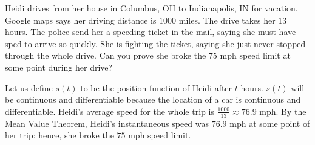 \documentclass[nooutcomes]{ximera}
\begin{document}
\begin{problem}
  Heidi drives from her house in Columbus, OH to Indianapolis, IN for vacation.
  Google maps says her driving distance is $1000$ miles.
  The drive takes her $13$ hours.
  The police send her a speeding ticket in the mail, saying she must have sped to arrive so quickly.
  She is fighting the ticket, saying she just never stopped through the whole drive.
  Can you prove she broke the $75$ mph speed limit at some point during her drive?
  \begin{freeResponse}
    Let us define $s(t)$ to be the position function of Heidi after $t$ hours.
    $s(t)$ will be continuous and differentiable because the location of a car is continuous and differentiable.
    Heidi’s average speed for the whole trip is $\frac{1000}{13}\approx 76.9$ mph.
    By the Mean Value Theorem, Heidi’s instantaneous speed was $76.9$ mph at some point of her trip: hence, she broke the $75$ mph speed limit.
  \end{freeResponse}
\end{problem}
\end{document}
